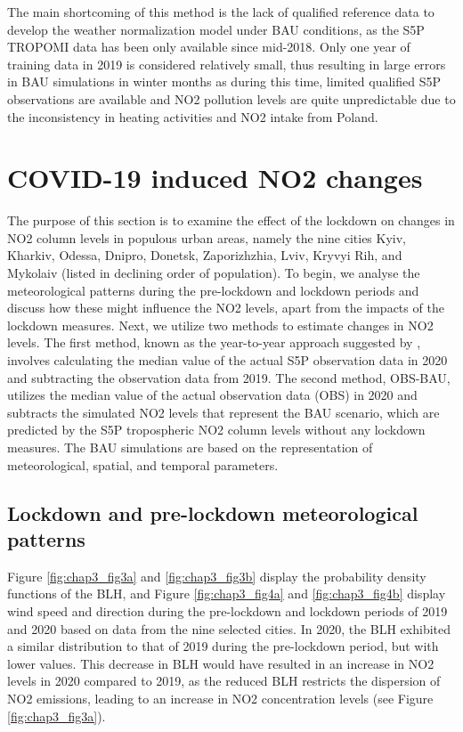 The main shortcoming of this method is the lack of qualified reference data to develop the weather normalization model under BAU conditions, as the S5P TROPOMI data has been only available since mid-2018. Only one year of training data in 2019 is considered relatively small, thus resulting in large errors in BAU simulations in winter months as during this time, limited qualified S5P observations are available and NO2 pollution levels are quite unpredictable due to the inconsistency in heating activities and NO2 intake from Poland.\par
\section{COVID-19 induced NO2 changes} \label{chap3_covid}
The purpose of this section is to examine the effect of the lockdown on changes in NO2 column levels in populous urban areas, namely the nine cities Kyiv, Kharkiv, Odessa, Dnipro, Donetsk, Zaporizhzhia, Lviv, Kryvyi Rih, and Mykolaiv (listed in declining order of population). To begin, we analyse the meteorological patterns during the pre-lockdown and lockdown periods and discuss how these might influence the NO2 levels, apart from the impacts of the lockdown measures. Next, we utilize two methods to estimate changes in NO2 levels. The first method, known as the year-to-year approach suggested by \citep{barre2021estimating}, involves calculating the median value of the actual S5P observation data in 2020 and subtracting the observation data from 2019. The second method, OBS-BAU, utilizes the median value of the actual observation data (OBS) in 2020 and subtracts the simulated NO2 levels that represent the BAU scenario, which are predicted by the S5P tropospheric NO2 column levels without any lockdown measures. The BAU simulations are based on the representation of meteorological, spatial, and temporal parameters. \par
\subsection{Lockdown and pre-lockdown meteorological patterns}
Figure \ref{fig:chap3_fig3a} and \ref{fig:chap3_fig3b} display the probability density functions of the BLH, and Figure \ref{fig:chap3_fig4a} and \ref{fig:chap3_fig4b} display wind speed and direction during the pre-lockdown and lockdown periods of 2019 and 2020 based on data from the nine selected cities. In 2020, the BLH exhibited a similar distribution to that of 2019 during the pre-lockdown period, but with lower values. This decrease in BLH would have resulted in an increase in NO2 levels in 2020 compared to 2019, as the reduced BLH restricts the dispersion of NO2 emissions, leading to an increase in NO2 concentration levels (see Figure \ref{fig:chap3_fig3a}). \par

